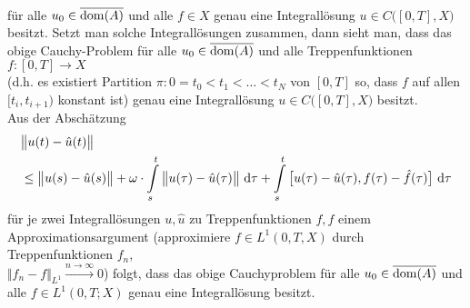 \begin{korollar}
\begin{enumerate}[label=(\alph*)]
\begin{align*}
\end{align*}
für alle $u_0\in\overline{\operatorname{dom}(A)}$ und alle $f\in X$ genau eine Integrallösung $u\in C\big([0,T],X\big)$ besitzt. Setzt man solche Integrallösungen zusammen, dann sieht man, dass das obige Cauchy-Problem für alle $u_0\in\overline{\operatorname{dom}(A)}$ und alle Treppenfunktionen $f\colon[0,T]\to X$\\
(d.h. es existiert Partition $\pi:0=t_0<t_1<\ldots<t_N$ von $[0,T]$ so, dass $f$ auf allen $[t_i,t_{i+1})$ konstant ist) genau eine Integrallösung $u\in C\big([0,T],X\big)$ besitzt.\\
Aus der Abschätzung
\begin{align*}
&\big\Vert u(t)-\hat{u}(t)\big\Vert\\
&\leq
\big\Vert u(s)-\hat{u}(s)\big\Vert
+\omega\cdot\int\limits_s^t\big\Vert u(\tau)-\hat{u}(\tau)\big\Vert\text{ d}\tau
+\int\limits_s^t\big[u(\tau)-\hat{u}(\tau),f(\tau)-\hat{f}(\tau)\big]\text{ d}\tau
\end{align*}
für je zwei Integrallösungen $u,\hat{u}$ zu Treppenfunktionen $f,\hat{f}$ einem Approximationsargument (approximiere $f\in L^1(0,T,X)$ durch Treppenfunktionen $f_n$,\\$\Vert f_n-f\Vert_{L^1}\stackrel{n\to\infty}{\longrightarrow}0$) folgt, dass das obige Cauchyproblem für alle $u_0\in\overline{\operatorname{dom}(A)}$ und alle $f\in L^1(0,T;X)$ genau eine Integrallösung besitzt.
\end{enumerate}
\end{korollar}
